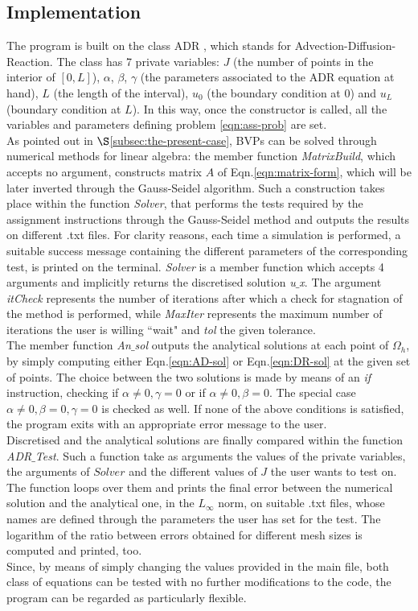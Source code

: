 \documentclass[11pt]{article}
\theoremstyle{theorem}
\theoremstyle{definition}
\begin{document}
\subsection{Implementation}
The program is built on the class ADR , which stands for Advection-Diffusion-Reaction. The class has 7 private variables: $J$ (the number of points in the interior of $[0,L]$), $\alpha$, $\beta$, $\gamma$ (the parameters associated to the ADR equation at hand), $L$ (the length of the interval), $u_0$ (the boundary condition at $0$) and $u_L$ (boundary condition at $L$). In this way, once the constructor is called, all the variables and parameters defining problem \eqref{eqn:ass-prob} are set.\\
As pointed out in $\S$\ref{subsec:the-present-case}, BVPs can be solved through numerical methods for linear algebra: the member function \emph{MatrixBuild}, which accepts no argument, constructs matrix $A$ of Eqn.\eqref{eqn:matrix-form}, which will be later inverted through the Gauss-Seidel algorithm. Such a construction takes place within the function \emph{Solver}, that performs the tests required by the assignment instructions through the Gauss-Seidel method and outputs the results on different .txt files. For clarity reasons,  each time a simulation is performed, a suitable success message containing the different parameters of the corresponding test, is printed on the terminal. \emph{Solver} is a member function which accepts 4 arguments and implicitly returns the discretised solution \emph{u$\_$x}. The argument \emph{itCheck} represents the number of iterations after which a check for stagnation of the method is performed, while \emph{MaxIter} represents the maximum number of iterations the user is willing ``wait" and \emph{tol} the given tolerance.\\ 
The member function \emph{An$\_$sol} outputs the analytical solutions at each point of $\Omega_h$, by simply computing either Eqn.\eqref{eqn:AD-sol} or Eqn.\eqref{eqn:DR-sol} at the given set of points. The choice between the two solutions is made by means of an \emph{if} instruction, checking if $\alpha\neq 0, \gamma=0$ or if $\alpha\neq 0, \beta=0$. The special case $\alpha\neq 0, \beta=0, \gamma=0$ is checked as well. If none of the above conditions is satisfied, the program exits with an appropriate error message to the user.\\
Discretised and the analytical solutions are finally compared within the function \emph{ADR$\_$Test}. Such a function take as arguments the values of the private variables, the arguments of $Solver$ and the different values of $J$ the user wants to test on. The function loops over them and prints the final error between the numerical solution and the analytical one, in the $L_\infty$ norm, on suitable .txt files, whose names are defined through the parameters the user has set for the test. The logarithm of the ratio between errors obtained for different mesh sizes is computed and printed, too.\\
Since, by means of simply changing the values provided in the main file, both class of equations can be tested with no further modifications to the code, the program can be regarded as particularly flexible.\\
\end{document}
